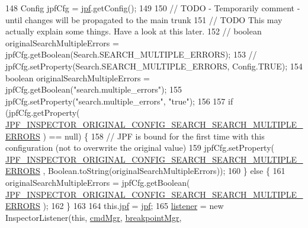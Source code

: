 \begin{DoxyCode}
148     Config jpfCfg = \hyperlink{classgov_1_1nasa_1_1jpf_1_1inspector_1_1server_1_1jpf_1_1_j_p_f_inspector_a04fbb7b09b55ee2c777428d3833fc353}{jpf}.getConfig();
149 
150     \textcolor{comment}{// TODO - Temporarily comment - until changes will be propagated to the main trunk}
151     \textcolor{comment}{// TODO This may actually explain some things. Have a look at this later.}
152     \textcolor{comment}{// boolean originalSearchMultipleErrors = jpfCfg.getBoolean(Search.SEARCH\_MULTIPLE\_ERRORS);}
153     \textcolor{comment}{// jpfCfg.setProperty(Search.SEARCH\_MULTIPLE\_ERRORS, Config.TRUE);}
154     \textcolor{keywordtype}{boolean} originalSearchMultipleErrors = jpfCfg.getBoolean(\textcolor{stringliteral}{"search.multiple\_errors"});
155     jpfCfg.setProperty(\textcolor{stringliteral}{"search.multiple\_errors"}, \textcolor{stringliteral}{"true"});
156 
157     \textcolor{keywordflow}{if} (jpfCfg.getProperty(
      \hyperlink{classgov_1_1nasa_1_1jpf_1_1inspector_1_1server_1_1jpf_1_1_j_p_f_inspector_a8af1cac155ad7ceb65c509f627741f3f}{JPF\_INSPECTOR\_ORIGINAL\_CONFIG\_SEARCH\_SEARCH\_MULTIPLE\_ERRORS}
      ) == null) \{
158       \textcolor{comment}{// JPF is bound for the first time with this configuration (not to overwrite the original value)}
159       jpfCfg.setProperty(
      \hyperlink{classgov_1_1nasa_1_1jpf_1_1inspector_1_1server_1_1jpf_1_1_j_p_f_inspector_a8af1cac155ad7ceb65c509f627741f3f}{JPF\_INSPECTOR\_ORIGINAL\_CONFIG\_SEARCH\_SEARCH\_MULTIPLE\_ERRORS}
      , Boolean.toString(originalSearchMultipleErrors));
160     \} \textcolor{keywordflow}{else} \{
161       originalSearchMultipleErrors = jpfCfg.getBoolean(
      \hyperlink{classgov_1_1nasa_1_1jpf_1_1inspector_1_1server_1_1jpf_1_1_j_p_f_inspector_a8af1cac155ad7ceb65c509f627741f3f}{JPF\_INSPECTOR\_ORIGINAL\_CONFIG\_SEARCH\_SEARCH\_MULTIPLE\_ERRORS}
      );
162     \}
163 
164     this.\hyperlink{classgov_1_1nasa_1_1jpf_1_1inspector_1_1server_1_1jpf_1_1_j_p_f_inspector_a04fbb7b09b55ee2c777428d3833fc353}{jpf} = \hyperlink{classgov_1_1nasa_1_1jpf_1_1inspector_1_1server_1_1jpf_1_1_j_p_f_inspector_a04fbb7b09b55ee2c777428d3833fc353}{jpf};
165     \hyperlink{classgov_1_1nasa_1_1jpf_1_1inspector_1_1server_1_1jpf_1_1_j_p_f_inspector_a8d5026db024c892d5569d22c5f2f0a5f}{listener} = \textcolor{keyword}{new} InspectorListener(\textcolor{keyword}{this}, \hyperlink{classgov_1_1nasa_1_1jpf_1_1inspector_1_1server_1_1jpf_1_1_j_p_f_inspector_a2341e868d4144a72f81153fb68efc39f}{cmdMgr}, \hyperlink{classgov_1_1nasa_1_1jpf_1_1inspector_1_1server_1_1jpf_1_1_j_p_f_inspector_a09d91c4c802c9c9822285507712015d2}{breakpointMgr}, 

\end{DoxyCode}
